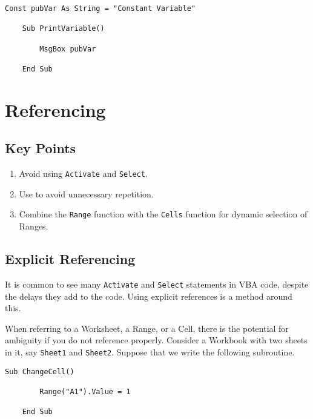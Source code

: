\documentclass[11pt]{article}%
\begin{document}
\begin{lstlisting}[style=A]
    Const pubVar As String = "Constant Variable"

    Sub PrintVariable()

        MsgBox pubVar

    End Sub
\end{lstlisting}



\section{Referencing}\label{sec:Referencing}


\subsection{Key Points}

\begin{enumerate}
    \item Avoid using \texttt{Activate} and \texttt{Select}.
    \item Use  to avoid unnecessary repetition.
    \item Combine the \texttt{Range} function with the \texttt{Cells} function for dynamic selection of Ranges.
\end{enumerate}


\subsection{Explicit Referencing}

It is common to see many \texttt{Activate} and \texttt{Select} statements in VBA code, despite the delays they add to the code. Using explicit references is a method around this.

When referring to a Worksheet, a Range, or a Cell, there is the potential for ambiguity if you do not reference properly. Consider a Workbook with two sheets in it, say \texttt{Sheet1} and \texttt{Sheet2}. Suppose that we write the following subroutine.\\

\begin{lstlisting}[style=A]
    Sub ChangeCell()

        Range("A1").Value = 1

    End Sub
\end{lstlisting}
\end{document}
